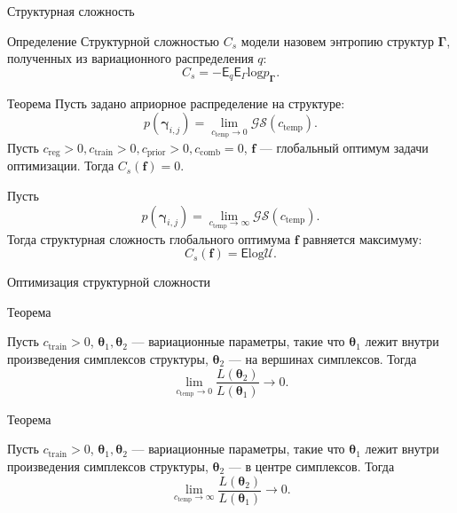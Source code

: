 \documentclass[usenames,dvipsnames,11pt,pdf,utf8,russian,aspectratio=43]{beamer}
\begin{document}
\begin{frame}{Структурная сложность}
\footnotesize
\begin{block}{Определение}
Структурной сложностью $C_s$ модели назовем энтропию структур $\boldsymbol{\Gamma}$, полученных из вариационного распределения $q$:
\[
    C_s = -\mathsf{E}_q \mathsf{E}_\Gamma \text{log} p_{\boldsymbol{\Gamma}}.
\]
\end{block}

\begin{block}{Теорема}
Пусть задано априорное распределение на структуре: $$p(\boldsymbol{\gamma}_{i,j}) =  \lim_{c_{\text{temp}} \to 0} \mathcal{GS}(c_{\text{temp}}).$$
Пусть $c_{\text{reg}} >0, c_{\text{train}} >0, c_{\text{prior}}>0, c_{\text{comb}}=0$, $\mathbf{f}$ --- глобальный оптимум задачи оптимизации.
Тогда 
$
    C_s(\mathbf{f}) = 0.
$
\end{block}

\begin{block}{}
Пусть $$p(\boldsymbol{\gamma}_{i,j}) =  \lim_{c_{\text{temp}} \to \infty} \mathcal{GS}(c_{\text{temp}}).$$
Тогда структурная сложность глобального оптимума $\mathbf{f}$ равняется максимуму:
\[
    C_s(\mathbf{f}) = \mathsf{E}\text{log}\mathcal{U}.
\]
\end{block}


\end{frame}
\begin{frame}{Оптимизация структурной сложности}
\begin{block}{Теорема}

Пусть $c_{\text{train}} >0$, $\boldsymbol{\theta}_1, \boldsymbol{\theta}_2$ --- вариационные параметры, такие что $\boldsymbol{\theta}_1$ лежит внутри произведения симплексов структуры, $\boldsymbol{\theta}_2$ --- на вершинах симплексов.
Тогда \[
\lim_{c_\text{temp} \to 0} \frac{L(\boldsymbol{\theta}_2)}{L(\boldsymbol{\theta}_1)} \to 0.
\]
\end{block}
\begin{block}{Теорема}

Пусть $c_{\text{train}} >0$, $\boldsymbol{\theta}_1, \boldsymbol{\theta}_2$ --- вариационные параметры, такие что $\boldsymbol{\theta}_1$ лежит внутри произведения симплексов структуры, $\boldsymbol{\theta}_2$ --- в центре симплексов.
Тогда \[
\lim_{c_\text{temp} \to \infty} \frac{L(\boldsymbol{\theta}_2)}{L(\boldsymbol{\theta}_1)} \to 0.
\]
\end{block}
\end{frame}
\end{document}
